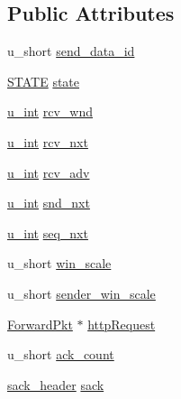 \subsection*{\-Public \-Attributes}
\begin{DoxyCompactItemize}
\item 
u\-\_\-short \hyperlink{structclientState_a0e0fb123e7ffc8245b9cd2d0a0bcd910}{send\-\_\-data\-\_\-id}
\item 
\hyperlink{split__tcp__gateway_8cpp_a275a67132f10277ada3a0ee3d616b647}{\-S\-T\-A\-T\-E} \hyperlink{structclientState_aef8cf7a72af3bae798bd4e8326b5d61b}{state}
\item 
\hyperlink{split__tcp__gateway_8h_ac319c165d52643e43249fe003e18bdf3}{u\-\_\-int} \hyperlink{structclientState_a5ca796c5aec186e39e85c726370a8b36}{rcv\-\_\-wnd}
\item 
\hyperlink{split__tcp__gateway_8h_ac319c165d52643e43249fe003e18bdf3}{u\-\_\-int} \hyperlink{structclientState_a552b5e5350327c8b4cf62bc29cbdf365}{rcv\-\_\-nxt}
\item 
\hyperlink{split__tcp__gateway_8h_ac319c165d52643e43249fe003e18bdf3}{u\-\_\-int} \hyperlink{structclientState_a0cfca459ca80f60fb437270fd6ffffad}{rcv\-\_\-adv}
\item 
\hyperlink{split__tcp__gateway_8h_ac319c165d52643e43249fe003e18bdf3}{u\-\_\-int} \hyperlink{structclientState_a28a9ed4d5fcc0e722dc99a18f3d71c73}{snd\-\_\-nxt}
\item 
\hyperlink{split__tcp__gateway_8h_ac319c165d52643e43249fe003e18bdf3}{u\-\_\-int} \hyperlink{structclientState_a613f1ad43c0aafb1c84c9808da352d88}{seq\-\_\-nxt}
\item 
u\-\_\-short \hyperlink{structclientState_afa81748837006012193d8cba0509d3db}{win\-\_\-scale}
\item 
u\-\_\-short \hyperlink{structclientState_a9b147083f792427bb0c0c1a5ed90333c}{sender\-\_\-win\-\_\-scale}
\item 
\hyperlink{structForwardPkt}{\-Forward\-Pkt} $\ast$ \hyperlink{structclientState_a022596d79ef75035f7cc5bdc33aba18b}{http\-Request}
\item 
u\-\_\-short \hyperlink{structclientState_a10d1f7df178df86fdda2dfe98839304f}{ack\-\_\-count}
\item 
\hyperlink{structsack__header}{sack\-\_\-header} \hyperlink{structclientState_aab42295f3498936be4c436b231e37582}{sack}
\end{DoxyCompactItemize}


